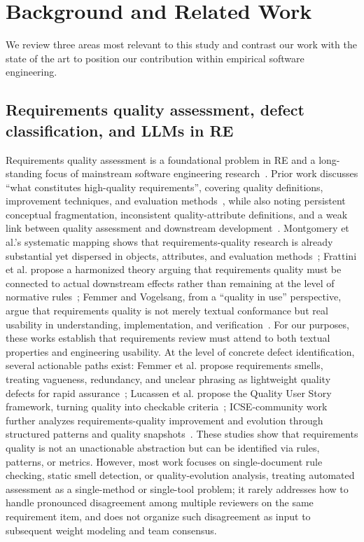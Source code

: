 \documentclass[sn-mathphys-num]{sn-jnl}
\begin{document}
\section{Background and Related Work}\label{sec:related}
We review three areas most relevant to this study and contrast our work with the state of the art to position our contribution within empirical software engineering.

\subsection{Requirements quality assessment, defect classification, and LLMs in RE}
Requirements quality assessment is a foundational problem in RE and a long-standing focus of mainstream software engineering research~\cite{ref1}. Prior work discusses ``what constitutes high-quality requirements'', covering quality definitions, improvement techniques, and evaluation methods~\cite{ref2}, while also noting persistent conceptual fragmentation, inconsistent quality-attribute definitions, and a weak link between quality assessment and downstream development~\cite{ref3}. Montgomery et al.'s systematic mapping shows that requirements-quality research is already substantial yet dispersed in objects, attributes, and evaluation methods~\cite{ref2}; Frattini et al. propose a harmonized theory arguing that requirements quality must be connected to actual downstream effects rather than remaining at the level of normative rules~\cite{ref3}; Femmer and Vogelsang, from a ``quality in use'' perspective, argue that requirements quality is not merely textual conformance but real usability in understanding, implementation, and verification~\cite{ref4}. For our purposes, these works establish that requirements review must attend to both textual properties and engineering usability. At the level of concrete defect identification, several actionable paths exist: Femmer et al. propose requirements smells, treating vagueness, redundancy, and unclear phrasing as lightweight quality defects for rapid assurance~\cite{ref5}; Lucassen et al. propose the Quality User Story framework, turning quality into checkable criteria~\cite{ref6}; ICSE-community work further analyzes requirements-quality improvement and evolution through structured patterns and quality snapshots~\cite{ref7,ref8}. These studies show that requirements quality is not an unactionable abstraction but can be identified via rules, patterns, or metrics. However, most work focuses on single-document rule checking, static smell detection, or quality-evolution analysis, treating automated assessment as a single-method or single-tool problem; it rarely addresses how to handle pronounced disagreement among multiple reviewers on the same requirement item, and does not organize such disagreement as input to subsequent weight modeling and team consensus.
\end{document}
